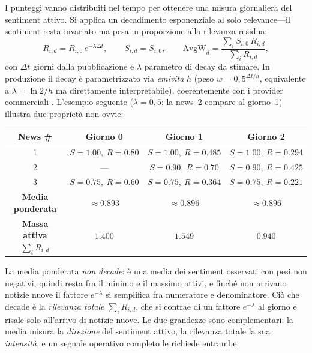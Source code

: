\documentclass[a4paper,11pt]{article}
\begin{document}
I punteggi vanno distribuiti nel tempo per ottenere una misura giornaliera del sentiment attivo. Si applica un decadimento esponenziale al solo relevance---il sentiment resta invariato ma pesa in proporzione alla rilevanza residua:
\[
R_{i,d} = R_{i,0}\, e^{-\lambda \Delta t}, \qquad
S_{i,d}=S_{i,0}, \qquad
\text{AvgW}_d = \frac{\sum_i S_{i,0}\, R_{i,d}}{\sum_i R_{i,d}},
\]
con $\Delta t$ giorni dalla pubblicazione e $\lambda$ parametro di decay da stimare. In produzione il decay è parametrizzato via \emph{emivita} $h$ (peso $w=0{,}5^{\Delta t/h}$, equivalente a $\lambda=\ln 2/h$ ma direttamente interpretabile), coerentemente con i provider commerciali \parencite{ravenpack_relevance, ravenpack_forex}. L'esempio seguente ($\lambda=0{,}5$; la news~2 compare al giorno~1) illustra due proprietà non ovvie:

\begin{table}[H]
\centering
\renewcommand{\arraystretch}{1.25}
\small
\begin{tabular}{|c|c|c|c|}
\hline
\textbf{News \#} & \textbf{Giorno 0} & \textbf{Giorno 1} & \textbf{Giorno 2} \\
\hline
1 & $S{=}1{.}00,\ R{=}0{.}80$ & $S{=}1{.}00,\ R{=}0{.}485$ & $S{=}1{.}00,\ R{=}0{.}294$ \\
2 & --- & $S{=}0{.}90,\ R{=}0{.}70$ & $S{=}0{.}90,\ R{=}0{.}425$ \\
3 & $S{=}0{.}75,\ R{=}0{.}60$ & $S{=}0{.}75,\ R{=}0{.}364$ & $S{=}0{.}75,\ R{=}0{.}221$ \\
\hline
\textbf{Media ponderata} & $\approx 0{.}893$ & $\approx 0{.}896$ & $\approx 0{.}896$ \\
\hline
\textbf{Massa attiva $\sum_i R_{i,d}$} & $1{.}400$ & $1{.}549$ & $0{.}940$ \\
\hline
\end{tabular}
\end{table}

\noindent La media ponderata \emph{non decade}: è una media dei sentiment osservati con pesi non negativi, quindi resta fra il minimo e il massimo attivi, e finché non arrivano notizie nuove il fattore $e^{-\lambda}$ si semplifica fra numeratore e denominatore. Ciò che decade è la \emph{rilevanza totale} $\sum_i R_{i,d}$, che si contrae di un fattore $e^{-\lambda}$ al giorno e risale solo all'arrivo di notizie nuove. Le due grandezze sono complementari: la media misura la \emph{direzione} del sentiment attivo, la rilevanza totale la sua \emph{intensità}, e un segnale operativo completo le richiede entrambe.
\end{document}

